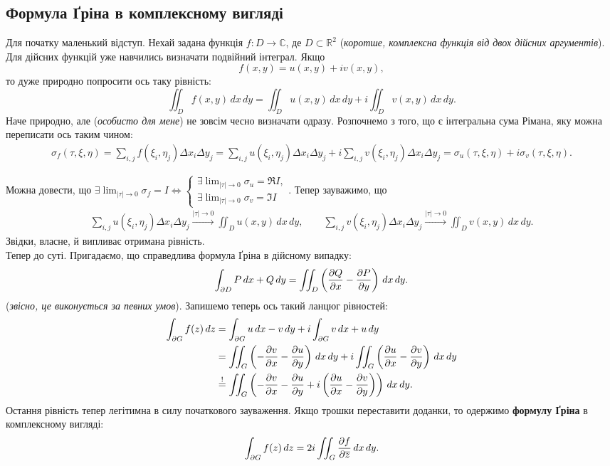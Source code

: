 \documentclass{math_library}
\begin{document}
\subsection{Формула Ґріна в комплексному вигляді}
Для початку маленький відступ. Нехай задана функція $f \colon D \to \mathbb{C}$, де $D \subset \mathbb{R}^2$ (\textit{коротше, комплексна функція від двох дійсних аргументів}). Для дійсних функцій уже навчились визначати подвійний інтеграл. Якщо
\[
f(x,y) = u(x,y) + iv(x,y),
\]
то дуже природно попросити ось таку рівність:
\[
\iint_D f(x,y)\,dx\,dy = \iint_D u(x,y)\,dx\,dy + i \iint_D v(x,y)\,dx\,dy.
\]
Наче природно, але (\textit{особисто для мене}) не зовсім чесно визначати одразу. Розпочнемо з того, що є інтегральна сума Рімана, яку можна переписати ось таким чином:
\begin{align*}
\sigma_f(\tau,\xi,\eta) = \sum_{i,j} f(\xi_i,\eta_j) \Delta x_i \Delta y_j = \sum_{i,j} u(\xi_i,\eta_j) \Delta x_i \Delta y_j + i \sum_{i,j} v(\xi_i,\eta_j) \Delta x_i \Delta y_j = \sigma_u(\tau,\xi,\eta) + i \sigma_v(\tau,\xi,\eta).
\end{align*}

Можна довести, що $\exists \displaystyle\lim_{|\tau| \to 0} \sigma_f = I \iff \begin{cases} \exists \lim_{|\tau| \to 0} \sigma_u = \Re I, \\ \exists \lim_{|\tau| \to 0} \sigma_v = \Im I \end{cases}$. Тепер зауважимо, що
\begin{align*}
\sum_{i,j} u(\xi_i,\eta_j) \Delta x_i \Delta y_j \overset{|\tau| \to 0}{\to} \iint_D u(x,y)\,dx\,dy, \qquad \sum_{i,j} v(\xi_i,\eta_j) \Delta x_i \Delta y_j \overset{|\tau| \to 0}{\to} \iint_D v(x,y)\,dx\,dy.
\end{align*}
Звідки, власне, й випливає отримана рівність.
\bigskip \\
Тепер до суті. Пригадаємо, що справедлива формула Ґріна в дійсному випадку:
\[
\int_{\partial D} P\,dx + Q\,dy = \iint_D \left( \dfrac{\partial {Q}}{\partial {x}} - \dfrac{\partial {P}}{\partial {y}} \right)\,dx\,dy.
\]
(\textit{звісно, це виконується за певних умов}). Запишемо теперь ось такий ланцюг рівностей:
\begin{align*}
\int_{\partial G} f(z)\,dz & = \int_{\partial G} u\,dx - v\,dy + i \int_{\partial G} v\,dx + u\,dy \\
& = \iint_G \left( -\dfrac{\partial {v}}{\partial {x}} - \dfrac{\partial {u}}{\partial {y}} \right)\,dx\,dy + i \iint_G \left( \dfrac{\partial {u}}{\partial {x}} - \dfrac{\partial {v}}{\partial {y}}\right)\,dx\,dy \\
& \overset{!}{=} \iint_G \left( -\dfrac{\partial {v}}{\partial {x}} - \dfrac{\partial {u}}{\partial {y}} + i \left( \dfrac{\partial {u}}{\partial {x}} - \dfrac{\partial {v}}{\partial {y}} \right) \right)\,dx\,dy.
\end{align*}
Остання рівність тепер легітимна в силу початкового зауваження. Якщо трошки переставити доданки, то одержимо \textbf{формулу Ґріна} в комплексному вигляді:
\begin{align*}
\int_{\partial G} f(z)\,dz = 2i \iint_G \dfrac{\partial {f}}{\partial {\overline{z}}}\,dx\,dy.
\end{align*}
\end{document}
